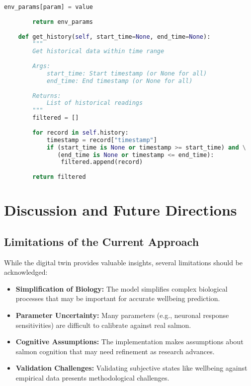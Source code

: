 \documentclass[11pt,a4paper]{article}
\begin{document}
\begin{lstlisting}[language=Python]
                env_params[param] = value
                
        return env_params
        
    def get_history(self, start_time=None, end_time=None):
        """
        Get historical data within time range
        
        Args:
            start_time: Start timestamp (or None for all)
            end_time: End timestamp (or None for all)
            
        Returns:
            List of historical readings
        """
        filtered = []
        
        for record in self.history:
            timestamp = record["timestamp"]
            if (start_time is None or timestamp >= start_time) and \
               (end_time is None or timestamp <= end_time):
                filtered.append(record)
                
        return filtered
\end{lstlisting}

\section{Discussion and Future Directions}
\subsection{Limitations of the Current Approach}
While the digital twin provides valuable insights, several limitations should be acknowledged:

\begin{itemize}
    \item \textbf{Simplification of Biology:} The model simplifies complex biological processes that may be important for accurate wellbeing prediction.
    
    \item \textbf{Parameter Uncertainty:} Many parameters (e.g., neuronal response sensitivities) are difficult to calibrate against real salmon.
    
    \item \textbf{Cognitive Assumptions:} The implementation makes assumptions about salmon cognition that may need refinement as research advances.
    
    \item \textbf{Validation Challenges:} Validating subjective states like wellbeing against empirical data presents methodological challenges.
\end{itemize}
\end{document}
